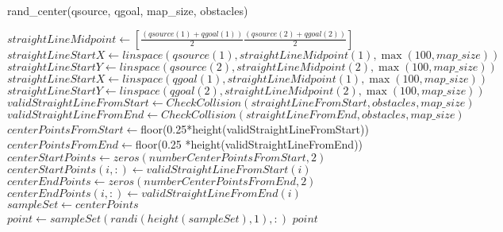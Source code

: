\documentclass{article}
\begin{document}
\begin{algorithm}
\caption{rand\_center(qsource, qgoal, map\_size, obstacles)}
\begin{algorithmic}[2]
    \State $straightLineMidpoint \gets [\frac{(qsource(1) + qgoal(1))}{2} \frac{(qsource(2) + qgoal(2))}{2}]$
    \State $straightLineStartX \gets {linspace}(qsource(1), straightLineMidpoint(1), \max(100, map\_size))$
    \State $straightLineStartY \gets {linspace}(qsource(2), straightLineMidpoint(2), \max(100, map\_size))$
    \State $straightLineStartX \gets {linspace}(qgoal(1), straightLineMidpoint(1), \max(100, map\_size))$
    \State $straightLineStartY \gets {linspace}(qgoal(2), straightLineMidpoint(2), \max(100, map\_size))$
    \State $validStraightLineFromStart \gets {CheckCollision}(straightLineFromStart, obstacles, map\_size)$
    \State $validStraightLineFromEnd \gets {CheckCollision}(straightLineFromEnd, obstacles, map\_size)$
    \State $centerPointsFromStart \gets ${floor(0.25*height(validStraightLineFromStart))}
    \State $centerPointsFromEnd \gets ${floor(0.25 *height(validStraightLineFromEnd))}
    \State $centerStartPoints \gets {zeros}(numberCenterPointsFromStart, 2)$
        \State $centerStartPoints(i, :) \gets validStraightLineFromStart(i)$
    \EndFor
    \State $centerEndPoints \gets {zeros}(numberCenterPointsFromEnd, 2)$
        \State $centerEndPoints(i, :) \gets validStraightLineFromEnd(i)$
    \EndFor
    \State $sampleSet \gets centerPoints$
    \State $point \gets sampleSet({randi}({height}(sampleSet), 1), :)$
    \State \Return $point$
\EndFunction
\end{algorithmic}
\end{algorithm}
\end{document}
